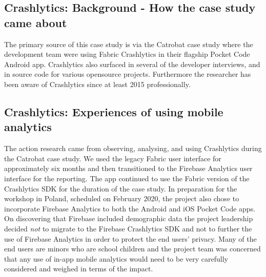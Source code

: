
\subsection{Crashlytics: Background - How the case study came about}
The primary source of this case study is via the Catrobat case study where the development team were using Fabric Crashlytics in their flagship Pocket Code Android app. Crashlytics also surfaced in several of the developer interviews, and in source code for various opensource projects. Furthermore the researcher has been aware of Crashlytics since at least 2015 professionally.

\subsection{Crashlytics: Experiences of using mobile analytics}
The action research came from observing, analysing, and using Crashlytics during the Catrobat case study. We used the legacy Fabric user interface for approximately six months and then transitioned to the Firebase Analytics user interface for the reporting. The app continued to use the Fabric version of the Crashlytics SDK for the duration of the case study. In preparation for the workshop in Poland, scheduled on  February 2020, the project also chose to incorporate Firebase Analytics to both the Android and iOS Pocket Code apps. On discovering that Firebase included demographic data the project leadership decided \emph{not} to migrate to the Firebase Crashlytics SDK and not to further the use of Firebase Analytics in order to protect the end users' privacy. Many of the end users are minors who are school children and the project team was concerned that any use of in-app mobile analytics would need to be very carefully considered and weighed in terms of the impact.

